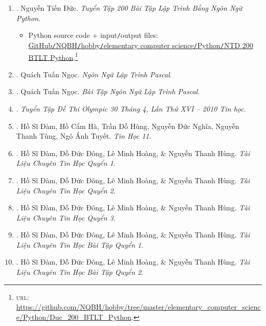 \documentclass{article}
\begin{document}
\begin{enumerate}
	\item \cite{Duc_200_BT_Python}. Nguyễn Tiến Đức. \textit{Tuyển Tập 200 Bài Tập Lập Trình Bằng Ngôn Ngữ Python}.\hfill{}
	\begin{itemize}
		\item Python source code $+$ input{\tt/}output files: \href{https://github.com/NQBH/hobby/tree/master/elementary_computer_science/Python/Duc_200_BTLT_Python}{GitHub{\tt/}NQBH{\tt/}hobby{\tt/}elementary computer science{\tt/}Python{\tt/}NTD 200 BTLT Python}.\footnote{\textsc{url}: \url{https://github.com/NQBH/hobby/tree/master/elementary_computer_science/Python/Duc_200_BTLT_Python}.}
	\end{itemize}
	\item \cite{Ngoc_Pascal}. Quách Tuấn Ngọc. \textit{Ngôn Ngữ Lập Trình Pascal}.\hfill{}
	\item \cite{Ngoc_BT_Pascal}. Quách Tuấn Ngọc. \textit{Bài Tập Ngôn Ngữ Lập Trình Pascal}.\hfill{}
	\item \cite{Olympic30-4_2010_Tin_Hoc}. \textit{Tuyển Tập Đề Thi Olympic 30 Tháng 4, Lần Thứ XVI -- 2010 Tin học}.\hfill{}
	\item \cite{SGK_Tin_Hoc_11}. Hồ Sĩ Đàm, Hồ Cẩm Hà, Trần Đỗ Hùng, Nguyễn Đức Nghĩa, Nguyễn Thanh Tùng, Ngô Ánh Tuyết. \textit{Tin Học 11}.\\\mbox{}\hfill{}
	\item \cite{TL_chuyen_Tin_quyen_1}. Hồ Sĩ Đàm, Đỗ Đức Đông, Lê Minh Hoàng, \& Nguyễn Thanh Hùng. \textit{Tài Liệu Chuyên Tin Học Quyển 1}.\\\mbox{}\hfill{}
	\item \cite{TL_chuyen_Tin_quyen_2}. Hồ Sĩ Đàm, Đỗ Đức Đông, Lê Minh Hoàng, \& Nguyễn Thanh Hùng. \textit{Tài Liệu Chuyên Tin Học Quyển 2}.\\\mbox{}\hfill{}
	\item \cite{TL_chuyen_Tin_quyen_3}. Hồ Sĩ Đàm, Đỗ Đức Đông, Lê Minh Hoàng, \& Nguyễn Thanh Hùng. \textit{Tài Liệu Chuyên Tin Học Quyển 3}.\\\mbox{}\hfill{}
	\item \cite{TL_chuyen_Tin_BT_quyen_1}. Hồ Sĩ Đàm, Đỗ Đức Đông, Lê Minh Hoàng, \& Nguyễn Thanh Hùng. \textit{Tài Liệu Chuyên Tin Học Bài Tập Quyển 1}.\\\mbox{}\hfill{}
	\item \cite{TL_chuyen_Tin_BT_quyen_2}. Hồ Sĩ Đàm, Đỗ Đức Đông, Lê Minh Hoàng, \& Nguyễn Thanh Hùng. \textit{Tài Liệu Chuyên Tin Học Bài Tập Quyển 2}.\hfill{}

\end{enumerate}
\end{document}
